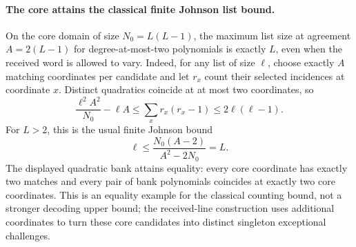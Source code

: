 \paragraph{The core attains the classical finite Johnson list bound.}
On the core domain of size $N_0=L(L-1)$, the maximum list size at
agreement $A=2(L-1)$ for degree-at-most-two polynomials is exactly $L$,
even when the received word is allowed to vary. Indeed, for any list
of size $\ell$, choose exactly $A$ matching coordinates per candidate
and let $r_x$ count their selected incidences at coordinate $x$.
Distinct quadratics coincide at at most two coordinates, so
\[
 \frac{\ell^2 A^2}{N_0}-\ell A
 \le \sum_x r_x(r_x-1)
 \le 2\ell(\ell-1).
\]
For $L>2$, this is the usual finite Johnson bound
\[
 \ell\le\frac{N_0(A-2)}{A^2-2N_0}=L.
\]
The displayed quadratic bank attains equality: every core coordinate
has exactly two matches and every pair of bank polynomials coincides
at exactly two core coordinates. This is an equality example for the
classical counting bound, not a stronger decoding upper bound; the
received-line construction uses additional coordinates to turn these
core candidates into distinct singleton exceptional challenges.
